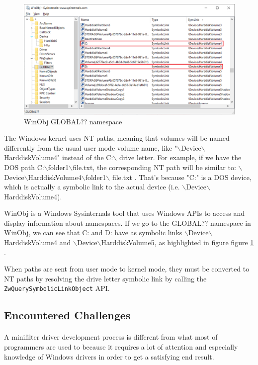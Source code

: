 		\begin{figure}[h!]
			\begin{center}
				\includegraphics[scale=0.6]{images/WinObj.jpg}
				\caption{WinObj GLOBAL?? namespace}
				\label{fig:WinObj}
			\end{center}
		\end{figure}
		
		The Windows kernel uses NT paths, meaning that volumes will be named differently from the usual user mode volume name, like "$\backslash$Device$\backslash$HarddiskVolume4" instead of the C:$\backslash$ drive letter. For example, if we have the DOS path C:$\backslash$folder1$\backslash$file.txt, the corresponding NT path will be similar to: $\backslash$Device$\backslash$HarddiskVolume4$\backslash$folder1$\backslash$ file.txt  \cite{MSDNNamespaces}. That's because "C:" is a DOS device, which is actually a symbolic link to the actual device (i.e. $\backslash$Device$\backslash$HarddiskVolume4).
		
		WinObj is a Windows Sysinternals tool that uses Windows APIs to access and display information about namespaces. If we go to the GLOBAL?? namespace in WinObj, we can see that C: and D: have as symbolic links $\backslash$Device$\backslash$ HarddiskVolume4 and $\backslash$Device$\backslash$HarddiskVolume5, as highlighted in figure figure \ref{fig:WinObj} .
		
		When paths are sent from user mode to kernel mode, they must be converted to NT paths by resolving the drive letter symbolic link by calling the \texttt{ZwQuerySymbolicLinkObject} API.
		
		\subsection{Encountered Challenges}
		\paragraph{}
		 A minifilter driver development process is different from what most of programmers are used to because it requires a lot of attention and especially knowledge of Windows drivers in order to get a satisfying end result.
		
